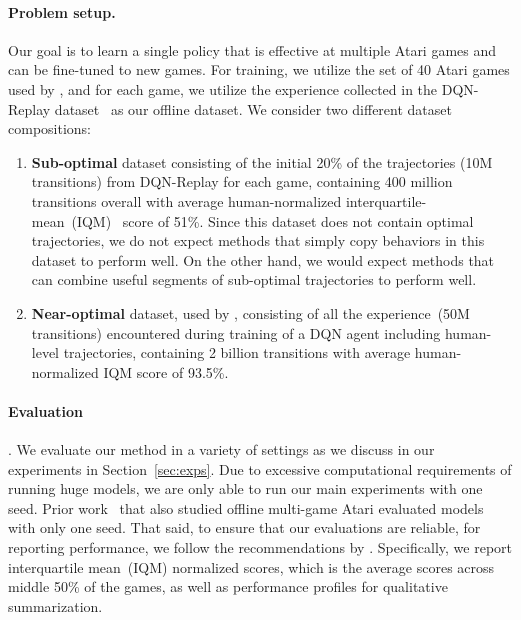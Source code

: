 \paragraph{Problem setup.} Our goal is to learn a single policy that is effective at multiple Atari games and can be fine-tuned to new games. For training, we utilize the set of 40 Atari games used by \citet{lee2022multi}, and for each game, we utilize the experience collected in the DQN-Replay dataset~\citep{agarwal2019optimistic} as our offline dataset. We consider two different dataset compositions: 
\begin{enumerate}
    \item \textbf{Sub-optimal} dataset consisting of the initial 20\% of the trajectories (10M transitions) from DQN-Replay for each game, containing 400 million transitions overall with average human-normalized interquartile-mean~(IQM)~\citep{agarwal2021deep} score of 51\%. Since this dataset does not contain optimal trajectories, we do not expect methods that simply copy behaviors in this dataset to perform well. On the other hand, we would expect methods that can combine useful segments of sub-optimal trajectories to perform well. 
    \item  \textbf{Near-optimal} dataset, used by \citet{lee2022multi}, consisting of all the experience~(50M transitions) encountered during training of a DQN agent including human-level trajectories, containing 2 billion transitions with average human-normalized IQM score of 93.5\%. 
\end{enumerate}

\paragraph{Evaluation}. We evaluate our method in a variety of settings as we discuss in our experiments in Section~\ref{sec:exps}. Due to excessive computational requirements of running huge models, we are only able to run our main experiments with one seed. Prior work~\citep{lee2022multi} that also studied offline multi-game Atari evaluated models with only one seed. That said, to ensure that our evaluations are reliable, for reporting performance, we follow the recommendations by \citet{agarwal2021deep}. Specifically, we report interquartile mean~(IQM) normalized scores, which is the average scores across middle 50\% of the games, as well as performance profiles for qualitative summarization. 

